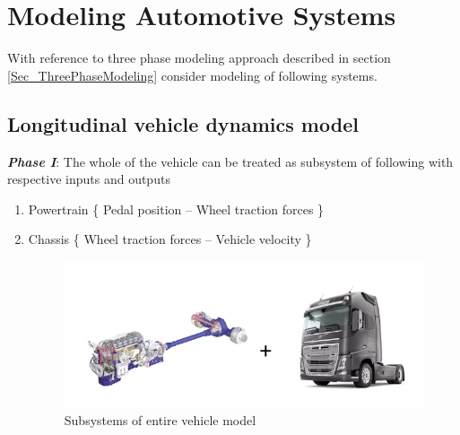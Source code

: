 \chapter{Modeling Automotive Systems}

With reference to three phase modeling approach described in section \ref{Sec_ThreePhaseModeling} consider modeling of following systems.

\section{Longitudinal vehicle dynamics model} \label{Sec_LongitudinalVehicleModel}

\textbf{\textit{Phase I}}: The whole of the vehicle can be treated as subsystem of following with respective inputs and outputs
\begin{enumerate}
	\item Powertrain \{ Pedal position -- Wheel traction forces \}
	\item Chassis \{ Wheel traction forces -- Vehicle velocity \}
	\begin{figure}[h!]
		\centering
		\includegraphics[width=0.5\linewidth]{Bilder/ModelAutoSystems_Subs1}
		\caption{Subsystems of entire vehicle model}
	\end{figure}
\end{enumerate}

